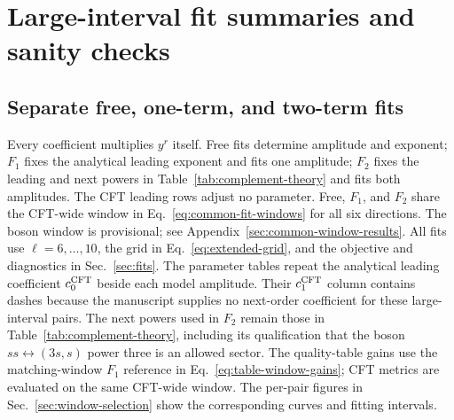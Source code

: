\clearpage
\section{Large-interval fit summaries and sanity checks}
\label{sec:complement-checks}

\subsection{Separate free, one-term, and two-term fits}
\label{sec:complement-fit-tables}
Every coefficient multiplies $y^r$ itself. Free fits determine amplitude
and exponent; $F_1$ fixes the analytical leading exponent and fits one
amplitude; $F_2$ fixes the leading and next powers in
Table~\ref{tab:complement-theory} and fits both amplitudes.
The CFT leading rows adjust no parameter. Free, $F_1$, and $F_2$ share
the CFT-wide window in Eq.~\eqref{eq:common-fit-windows} for all
six directions. The boson window is provisional; see
Appendix~\ref{sec:common-window-results}. All fits use $\ell=6,\ldots,10$,
the grid in Eq.~\eqref{eq:extended-grid}, and the
objective and diagnostics in Sec.~\ref{sec:fits}. The parameter tables
repeat the analytical leading coefficient $c_0^{\rm CFT}$ beside each
model amplitude. Their $c_1^{\rm CFT}$ column contains dashes because
the manuscript supplies no next-order coefficient for these large-interval
pairs. The next powers used in $F_2$ remain those in
Table~\ref{tab:complement-theory}, including its qualification that
the boson $ss\leftrightarrow(3s,s)$ power three is an allowed sector.
The quality-table gains use the matching-window $F_1$ reference in
Eq.~\eqref{eq:table-window-gains}; CFT metrics are evaluated on
the same CFT-wide window. The per-pair figures in Sec.~\ref{sec:window-selection}
show the corresponding curves and fitting intervals.
\begingroup\footnotesize\setlength{\tabcolsep}{3pt}


\clearpage


\endgroup

